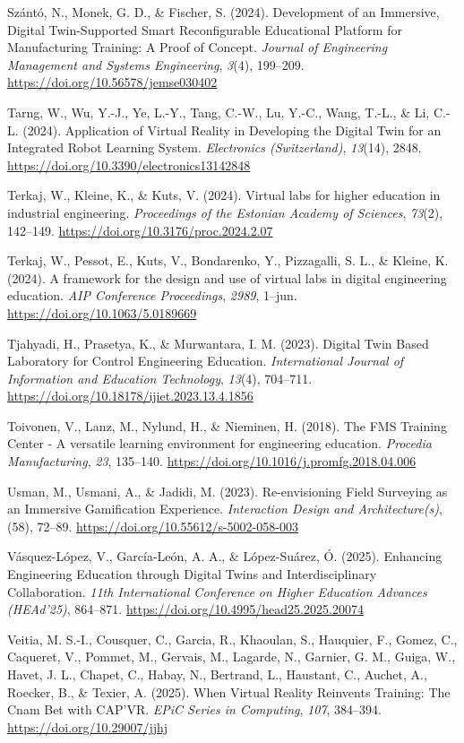 Szántó, N., Monek, G. D., \& Fischer, S. (2024). Development of an
Immersive, Digital Twin-Supported Smart Reconfigurable Educational
Platform for Manufacturing Training: A Proof of Concept. \emph{Journal of
Engineering Management and Systems Engineering}, \emph{3}(4), 199--209.
\url{https://doi.org/10.56578/jemse030402}

Tarng, W., Wu, Y.-J., Ye, L.-Y., Tang, C.-W., Lu, Y.-C., Wang, T.-L., \&
Li, C.-L. (2024). Application of Virtual Reality in Developing the
Digital Twin for an Integrated Robot Learning System. \emph{Electronics
(Switzerland)}, \emph{13}(14), 2848.
\url{https://doi.org/10.3390/electronics13142848}

Terkaj, W., Kleine, K., \& Kuts, V. (2024). Virtual labs for higher
education in industrial engineering. \emph{Proceedings of the Estonian
Academy of Sciences}, \emph{73}(2), 142--149.
\url{https://doi.org/10.3176/proc.2024.2.07}

Terkaj, W., Pessot, E., Kuts, V., Bondarenko, Y., Pizzagalli, S. L., \&
Kleine, K. (2024). A framework for the design and use of virtual labs in
digital engineering education. \emph{AIP Conference Proceedings}, \emph{2989},
1--jun. \url{https://doi.org/10.1063/5.0189669}

Tjahyadi, H., Prasetya, K., \& Murwantara, I. M. (2023). Digital Twin
Based Laboratory for Control Engineering Education. \emph{International
Journal of Information and Education Technology}, \emph{13}(4), 704--711.
\url{https://doi.org/10.18178/ijiet.2023.13.4.1856}

Toivonen, V., Lanz, M., Nylund, H., \& Nieminen, H. (2018). The FMS
Training Center - A versatile learning environment for engineering
education. \emph{Procedia Manufacturing}, \emph{23}, 135--140.
\url{https://doi.org/10.1016/j.promfg.2018.04.006}

Usman, M., Usmani, A., \& Jadidi, M. (2023). Re-envisioning Field
Surveying as an Immersive Gamification Experience. \emph{Interaction Design
and Architecture(s)}, (58), 72--89.
\url{https://doi.org/10.55612/s-5002-058-003}

Vásquez-López, V., García-León, A. A., \& López-Suárez, Ó. (2025).
Enhancing Engineering Education through Digital Twins and
Interdisciplinary Collaboration. \emph{11th International Conference on
Higher Education Advances (HEAd'25)}, 864--871.
\url{https://doi.org/10.4995/head25.2025.20074}

Veitia, M. S.-I., Cousquer, C., Garcia, R., Khaoulan, S., Hauquier, F.,
Gomez, C., Caqueret, V., Pommet, M., Gervais, M., Lagarde, N., Garnier,
G. M., Guiga, W., Havet, J. L., Chapet, C., Habay, N., Bertrand, L.,
Haustant, C., Auchet, A., Roecker, B., \& Texier, A. (2025). When Virtual
Reality Reinvents Training: The Cnam Bet with CAP'VR. \emph{EPiC Series in
Computing}, \emph{107}, 384--394. \url{https://doi.org/10.29007/jjhj}

